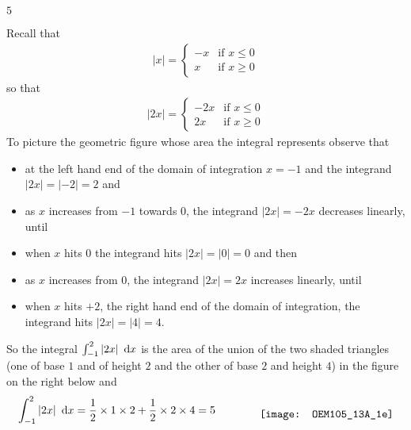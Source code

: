 \begin{answer}
$5$
\end{answer}

\begin{solution}
Recall that
\begin{align*}
|x|=\begin{cases} -x &\text{if $x\le 0$}\\
                   x &\text{if $x\ge 0$}
    \end{cases}
\end{align*}
so that
\begin{align*}
|2x|=\begin{cases} -2x &\text{if $x\le 0$}\\
                    2x &\text{if $x\ge 0$}
    \end{cases}
\end{align*}
To picture the geometric figure whose area the integral represents
observe that
\begin{itemize}\itemsep1pt \parskip0pt  %
\item
at the left hand end of the domain of integration $x=-1$ and
the integrand $|2x|=|-2|=2$ and
\item
as $x$ increases from $-1$ towards $0$, the integrand $|2x|=-2x$ decreases
linearly, until
\item
when $x$ hits $0$ the integrand hits  $|2x|=|0|=0$ and then
\item
as $x$ increases from $0$, the integrand $|2x|=2x$ increases
linearly, until
\item
when $x$ hits $+2$, the right hand end of the domain of integration, the
integrand hits
$|2x|=|4|=4$.
\end{itemize}
So the integral $\int_{-1}^2 |2x|\ \,\dee{x}$  is the area of
the union of the two shaded triangles (one of base $1$ and of height $2$
and the other of base $2$ and height $4$) in the figure on
the right below and
\begin{align*}
\int_{-1}^2 |2x|\ \,\dee{x}
= \frac{1}{2}\times 1\times 2 + \frac{1}{2}\times 2\times 4
= 5\qquad\qquad
\raisebox{-0.5\height}{\texttt{[image: OEM105\_13A\_1e]}}
\end{align*}


\end{solution}


